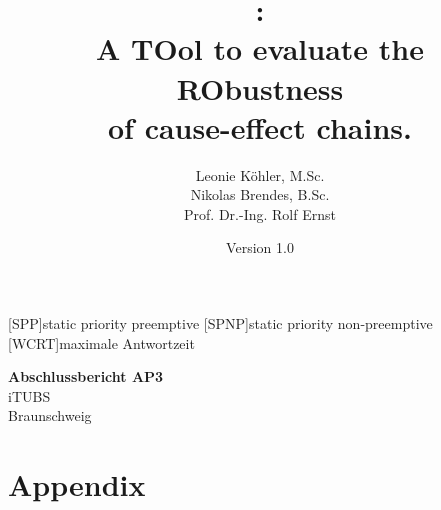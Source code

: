 \documentclass[11pt, a4paper, openany]{article}
\newcommand{\Tool}{
\textbf{\textsc{\rmfamily{Toro}}}\xspace}
\begin{document}
 

\begin{acronym}[ECU]
[SPP]{static priority preemptive}
[SPNP]{static priority non-preemptive}
[WCRT]{maximale Antwortzeit}
\end{acronym}


\newcommand{\EqSize}{\small}			%
\newcommand{\AlgSize}{\small}			%
\newcommand{\LstSize}{\scriptsize}			%
\preto\align{\par\nobreak\EqSize\noindent}
\preto\equation{\par\nobreak\EqSize\noindent}
\preto\algorithmic{\par\nobreak\AlgSize\noindent}

\begin{titlepage}
\pagestyle{plain}

\title{\Tool: \\
\LARGE{A TOol to evaluate the RObustness}\\ 
\LARGE{of cause-effect chains}.}
\author{
Leonie Köhler, M.Sc.\\%
Nikolas Brendes, B.Sc. \\
Prof. Dr.-Ing. Rolf Ernst}
\date{Version 1.0}
\maketitle 
\thispagestyle{empty}


\begin{flushright}

\Large\textbf{Abschlussbericht AP3}
\\[1cm]
\large
iTUBS \\ Braunschweig 
\end{flushright} 


\end{titlepage}

\pagestyle{plain}

\tableofcontents
\clearpage
\clearpage
\pagestyle{fancyplain}




\newpage

\newpage

\newpage

\newpage
\appendix
\section{Appendix} 

\end{document}
